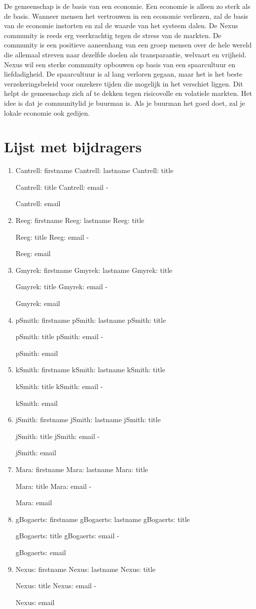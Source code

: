 \documentclass[11pt]{article}
\newcommand{\printcontributor}[1]{%
  \begingroup
  \parindent 0pt
  \usevalue #1: firstname
  \space
  \usevalue #1: lastname
  \ifattribute #1: title {\par}{\relax}
  \usevalue #1: title
  \ifattribute #1: email {\space-\space} {\par\relax}
  \usevalue #1: email
  \endgroup
}
\begin{document}
\noindent De gemeenschap is de basis van een economie. Een economie is alleen zo sterk als de basis. Wanneer mensen het vertrouwen in een economie verliezen, zal de basis van de economie instorten en zal de waarde van het systeem dalen. De Nexus community is reeds erg veerkrachtig tegen de stress van de markten. De community is een positieve aaneenhang van een groep mensen over de hele wereld die allemaal streven naar dezelfde doelen als transparantie, welvaart en vrijheid.\\ 

\noindent Nexus wil een sterke community opbouwen op basis van een spaarcultuur en liefdadigheid. De spaarcultuur is al lang verloren gegaan, maar het is het beste verzekeringsbeleid voor onzekere tijden die mogelijk in het verschiet liggen. Dit helpt de gemeenschap zich af te dekken tegen risicovolle en volatiele markten. Het idee is dat je communitylid je buurman is. Als je buurman het goed doet, zal je lokale economie ook gedijen. 

\section{Lijst met bijdragers}

\begingroup
\parindent 0pt
\parskip  8pt

\begin{enumerate}
\item 
\printcontributor{Cantrell}

\item
\printcontributor{Reeg}

\item
\printcontributor{Gmyrek}

\item
\printcontributor{pSmith}

\item
\printcontributor{kSmith}

\item
\printcontributor{jSmith}

\item
\printcontributor{Mara}

\item
\printcontributor{gBogaerts}

\item
\printcontributor{Nexus}
\end{enumerate}

\endgroup
\end{document}
